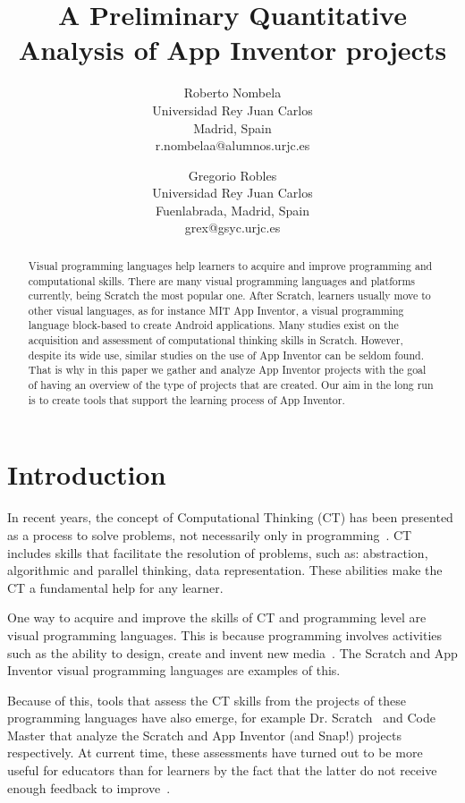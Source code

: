\documentclass[a4paper]{article}
\title{A Preliminary Quantitative Analysis of App Inventor projects}
\author{
Roberto Nombela \\ Universidad Rey Juan Carlos\\
                Madrid, Spain \\ r.nombelaa@alumnos.urjc.es
\and
Gregorio Robles \\Universidad Rey Juan Carlos \\
                Fuenlabrada, Madrid, Spain \\grex@gsyc.urjc.es
}
\begin{document}
\maketitle

\begin{abstract}
Visual programming languages help learners to acquire and improve programming and computational skills.
There are many visual programming languages and platforms currently, being Scratch the most popular one.
After Scratch, learners usually move to other visual languages, as for instance MIT App Inventor, a visual programming language block-based to create Android applications.
Many studies exist on the acquisition and assessment of computational thinking skills in Scratch.
However, despite its wide use, similar studies on the use of App Inventor can be seldom found.
That is why in this paper we gather and analyze App Inventor projects with the goal of having an overview of the type of projects that are created.
Our aim in the long run is to create tools that support the learning process of App Inventor.
\end{abstract}


\section{Introduction}

In recent years, the concept of Computational Thinking (CT) has been presented as a process to solve problems, not necessarily only in programming~\cite{wing2006computational}. 
CT includes skills that facilitate the resolution of problems, such as: abstraction, algorithmic and parallel thinking, data representation. These abilities make the CT a fundamental help for any learner.

One way to acquire and improve the skills of CT and programming level are visual programming languages.
This is because programming involves activities such as the ability to design, create and invent new media~\cite{resnick2009scratch}.
The Scratch and App Inventor visual programming languages are examples of this.

Because of this, tools that assess the CT skills from the projects of these programming languages have also emerge, for example Dr. Scratch~\cite{moreno2015dr} and Code Master that analyze the Scratch and App Inventor (and Snap!) projects respectively. 
At current time, these assessments have turned out to be more useful for educators than for learners by the fact that the latter do not receive enough feedback to improve~\cite{robles2018ontools}.
\end{document}
